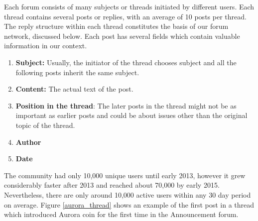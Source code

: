 Each forum consists of many subjects or threads initiated by different users.
Each thread contains several posts or replies, with an average of 10 posts per
thread.  The reply structure within each thread constitutes the basis of our
forum network, discussed below.  Each post has several fields which contain
valuable information in our context.
\begin{enumerate}[topsep=0pt,itemsep=-0.5ex,partopsep=1ex,parsep=1ex]
  \item \textbf{Subject:} Usually, the initiator of the thread chooses subject and all the
    following posts inherit the same subject.
  \item \textbf{Content:} The actual text of the post.
  \item \textbf{Position in the thread}: The later posts in the thread might not be as important
    as earlier posts and could be about issues other than the original topic of the thread.
  \item \textbf{Author}
  \item \textbf{Date}
\end{enumerate}
The community had only 10,000 unique users until early 2013, however it grew considerably faster after 2013 and reached about 70,000 by early 2015.
Nevertheless, there are only around 10,000 active users within any 30 day period on average.
Figure \ref{aurora_thread} shows an example of the first post in a thread which introduced Aurora coin for the first time in the Announcement forum.
